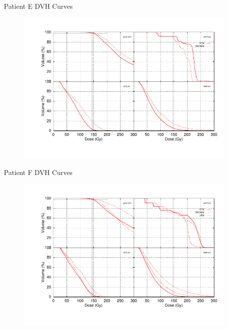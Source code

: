\documentclass{beamer}
\begin{document}
\begin{frame}{Patient E DVH Curves}
  
  \begin{figure}[h!]
    \begin{center}
      \includegraphics[width=4.3in]{figures/duffrin_tmp-all4x4.pdf}
    \end{center}
  \end{figure}

\end{frame}

\begin{frame}{Patient F DVH Curves}
  
  \begin{figure}[h!]
    \begin{center}
      \includegraphics[width=4.3in]{figures/faber_9_11_98-all4x4.pdf}
    \end{center}
  \end{figure}

\end{frame}
\end{document}
